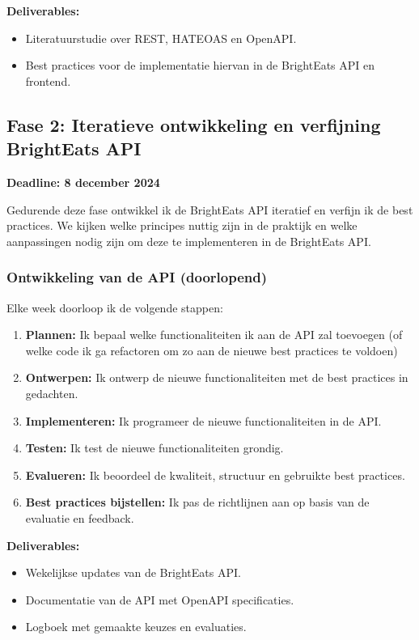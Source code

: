\textbf{Deliverables:}

\begin{itemize}
  \item Literatuurstudie over REST, HATEOAS en OpenAPI.
  \item Best practices voor de implementatie hiervan in de BrightEats API en frontend.
\end{itemize}

\subsection{Fase 2: Iteratieve ontwikkeling en verfijning BrightEats API}

\textbf{Deadline: 8 december 2024}

\bigskip
Gedurende deze fase ontwikkel ik de BrightEats API iteratief en verfijn ik de best practices. We kijken welke principes nuttig zijn in de praktijk en welke aanpassingen nodig zijn om deze te implementeren in de BrightEats API.

\subsubsection{Ontwikkeling van de API (doorlopend)}

\bigskip
Elke week doorloop ik de volgende stappen:

\begin{enumerate}
  \item \textbf{Plannen:} Ik bepaal welke functionaliteiten ik aan de API zal toevoegen (of welke code ik ga refactoren om zo aan de nieuwe best practices te voldoen)
  \item \textbf{Ontwerpen:} Ik ontwerp de nieuwe functionaliteiten met de best practices in gedachten.
  \item \textbf{Implementeren:} Ik programeer de nieuwe functionaliteiten in de API.
  \item \textbf{Testen:} Ik test de nieuwe functionaliteiten grondig.
  \item \textbf{Evalueren:} Ik beoordeel de kwaliteit, structuur en gebruikte best practices.
  \item \textbf{Best practices bijstellen:} Ik pas de richtlijnen aan op basis van de evaluatie en feedback.
\end{enumerate}

\textbf{Deliverables:}

\begin{itemize}
  \item Wekelijkse updates van de BrightEats API.
  \item Documentatie van de API met OpenAPI specificaties.
  \item Logboek met gemaakte keuzes en evaluaties.
\end{itemize}

